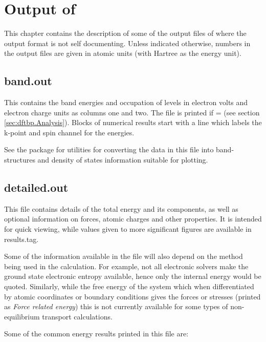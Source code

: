 \chapter{Output of \dftbpxt}
\label{sec:dftbp.output}

This chapter contains the description of some of the output files of
\dftbp{} where the output format is not self documenting. Unless
indicated otherwise, numbers in the output files are given in atomic
units (with Hartree as the energy unit).

\section{band.out}
\label{sec:dftbp.bandout}

This contains the band energies and occupation of levels in electron volts and
electron charge units as columns one and two. The file is printed if
 =  (see section \ref{sec:dftbp.Analysis}). Blocks of
numerical results start with a line which labels the k-point and spin channel
for the energies.

See the \dptools{} package for utilities for converting the data in this file
into band-structures and density of states information suitable for plotting.

\section{detailed.out}
\label{sec:dftbp.detailedout}

This file contains details of the total energy and its components, as well as
optional information on forces, atomic charges and other properties. It is
intended for quick viewing, while values given to more significant figures are
available in results.tag.

Some of the information available in the file will also depend on the method
being used in the calculation. For example, not all electronic solvers make the
ground state electronic entropy available, hence only the internal energy would
be quoted. Similarly, while the free energy of the system which when
differentiated by atomic coordinates or boundary conditions gives the forces or
stresses (printed as \textit{Force related energy}) this is not currently
available for some types of non-equilibrium transport calculations.

Some of the common energy results printed in this file are:\\

